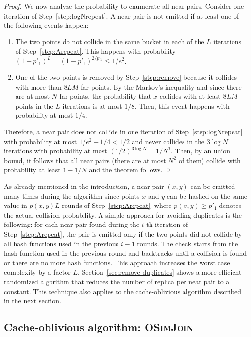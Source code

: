 \documentclass{llncs}
\newcommand{\SimJoin}{\textsc{OSimJoin}}
\begin{document}
\begin{proof}
We now  analyze the probability to enumerate all near pairs.
Consider one iteration of Step~\ref{step:logNrepeat}. A near pair is not emitted
if at least one of the following events happen:
\begin{enumerate}
 \item The two points do not collide in the same bucket in each of the $L$
iterations of Step~\ref{step:Arepeat}. This happens with probability
$(1-p'_1)^L = (1-p'_1)^{2/p'_1} \leq 1/e^2$.
 \item One of the two points is removed by Step~\ref{step:remove} because it
collides with more than $8 LM$ far points.
By the Markov's inequality and since there are at most $N$ far points, the
probability that $x$ collides with at least $8 LM$ points in the $L$ iterations
is at most $1/8$. Then, this event happens with probability at most $1/4$.
\end{enumerate}
Therefore, a near pair does not collide in one  iteration of
Step~\ref{step:logNrepeat} with probability at most $1/e^2+1/4<1/2$ and never
collides in the $3\log N$ iterations with probability at most $(1/2)^{3 \log
N}=1/N^{3}$.
Then, by an union bound, it follows that all near pairs (there are at most $N^2$
of them) collide with probability at least $1-1/N$ and the theorem
follows.
\qed
\end{proof}

As already mentioned in the introduction, a near pair $(x,y)$ can be emitted many times during the algorithm since points $x$ and $y$ can be hashed on the same value in $p(x,y)L$ rounds of Step~\ref{step:Arepeat}, where $p(x,y)\geq p'_1$ denotes the actual collision probability.
A simple approach for avoiding duplicates is the following: for each near pair found during the $i$-th iteration of Step~\ref{step:Arepeat}, the pair is emitted only if the two points did not collide by all hash functions used in the previous $i-1$ rounds.
The check starts from the hash function used in the previous round and backtracks until a collision is found or there are no more hash functions. This approach increases the worst case complexity by a factor $L$.
Section~\ref{sec:remove-duplicates} shows a more efficient randomized algorithm that reduces the number of replica per near pair to a constant. 
This technique also applies to the cache-oblivious algorithm described in the next section.





\subsection{Cache-oblivious algorithm: \SimJoin\ }\label{sec:cacheobl}
\end{document}
